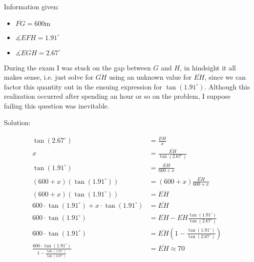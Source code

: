 \begin{figure}[!h]
\centering
{}
\end{figure}

Information given:

\begin{itemize}
    \item $\overline{FG} = 600  {\displaystyle {\text{m}}}$
    \item $\measuredangle EFH = 1.91^\circ$
    \item $\measuredangle EGH = 2.67^\circ$
\end{itemize}

During the exam I was stuck on the gap between $G$ and $H$, in hindsight it all makes sense, i.e. just solve for $\overline{GH}$ using an unknown value for $\overline{EH}$, since we can factor this quantity out in the ensuing expression for $\tan(1.91^\circ)$. Although this realization occurred after spending an hour or so on the problem, I suppose failing this question was inevitable.

Solution:

\begin{equation}
\begin{split}
\tan(2.67^\circ) &= \frac{\overline{EH}}{x} \\
x &= \frac{\overline{EH}}{\tan(2.67^\circ)} \\
\tan(1.91^\circ) &= \frac{\overline{EH}}{600 + x} \\
(600 + x)(\tan(1.91^\circ)) &= (600 + x)\frac{\overline{EH}}{600 + x} \\
(600 + x)(\tan(1.91^\circ)) &= \overline{EH} \\
600 \cdot \tan(1.91^\circ) + x \cdot \tan(1.91^\circ) &= \overline{EH} \\
600 \cdot \tan(1.91^\circ) &= \overline{EH} - \overline{EH} \frac{\tan(1.91^\circ)}{\tan(2.67^\circ)} \\
600 \cdot \tan(1.91^\circ) &= \overline{EH}(1 - \frac{\tan(1.91^\circ)}{\tan(2.67^\circ)}) \\
\frac{600 \cdot \tan(1.91^\circ)}{1 - \frac{\tan(1.91^\circ)}{\tan(2.67^\circ)}} &= \overline{EH} \approx 70
\end{split}
\end{equation}

